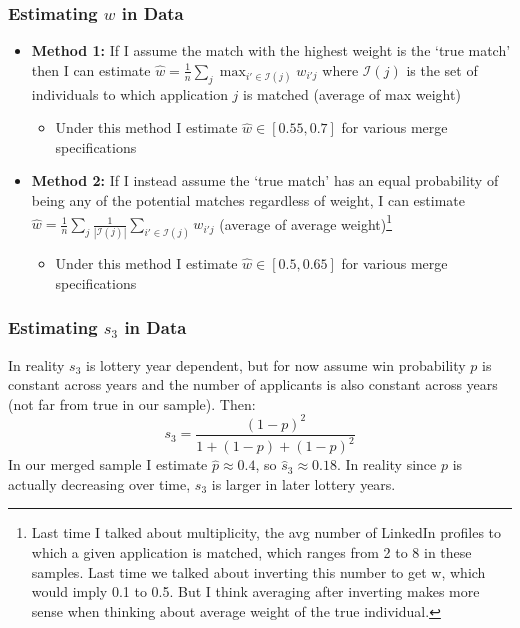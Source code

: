 \documentclass[xcolor=dvipsnames, compress, 12pt, aspectratio=169, handout]{beamer}
\begin{document}
\appendix


\begin{frame}
    \frametitle{Estimating $w$ in Data}

    \begin{itemize}
        \item \textbf{Method 1:} If I assume the match with the highest weight is the `true match' then I can estimate $\hat{w} = \frac{1}{n} \sum_{j} \max_{i' \in \mathcal{I}(j)} w_{i'j}$ where $\mathcal{I}(j)$ is the set of individuals to which application $j$ is matched (average of max weight)
        \begin{itemize}
            \item Under this method I estimate $\hat{w} \in [0.55,0.7]$ for various merge specifications
        \end{itemize}
        \vspace{2mm}
        \item \textbf{Method 2:} If I instead assume the `true match' has an equal probability of being any of the potential matches regardless of weight, I can estimate $\hat{w} = \frac{1}{n} \sum_{j} \frac{1}{|\mathcal{I}(j)|}\sum_{i' \in \mathcal{I}(j)} w_{i'j}$ (average of average weight)\footnote{Last time I talked about multiplicity, the avg number of LinkedIn profiles to which a given application is matched, which ranges from 2 to 8 in these samples. Last time we talked about inverting this number to get w, which would imply 0.1 to 0.5. But I think averaging after inverting makes more sense when thinking about average weight of the true individual.}
        \begin{itemize}
            \item Under this method I estimate $\hat{w} \in [0.5,0.65]$ for various merge specifications
        \end{itemize}
    \end{itemize}
\end{frame}


\begin{frame}
    \frametitle{Estimating $s_3$ in Data}
    In reality $s_3$ is lottery year dependent, but for now assume win probability $p$ is constant across years and the number of applicants is also constant across years (not far from true in our sample). Then:
    \begin{equation*}
        s_3 = \frac{(1-p)^2}{1 + (1-p) + (1-p)^2}
    \end{equation*}
    In our merged sample I estimate $\hat{p} \approx 0.4$, so $\hat{s}_3 \approx 0.18$. In reality since $p$ is actually decreasing over time, $s_3$ is larger in later lottery years.
\end{frame}
\end{document}
